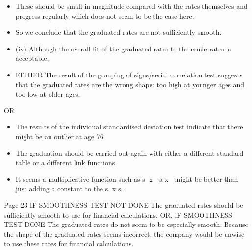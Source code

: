 \documentclass[a4paper,12pt]{article}
\begin{document}
\begin{itemize}
    \item These should be small in magnitude compared with the rates themselves and
progress regularly which does not seem to be the case here.
\item So we conclude that the graduated rates are not sufficiently smooth. 
\item (iv) Although the overall fit of the graduated rates to the crude rates is
acceptable,
\item EITHER
The result of the grouping of signs/serial correlation test suggests that the
graduated rates are the wrong shape: too high at younger ages and too low at
older ages.
\end{itemize}

OR
\begin{itemize}
\item The results of the individual standardised deviation test indicate that there might be an outlier at age 76
\item The graduation should be carried out again with either a different standard
table or a different link functions
\item It seems a multiplicative function such as s
x  ax  might be better than just
adding a constant to the s
x s.
\end{itemize}

Page 23
IF SMOOTHNESS TEST NOT DONE
The graduated rates should be sufficiently smooth to use for financial
calculations.
OR, IF SMOOTHNESS TEST DONE
The graduated rates do not seem to be especially smooth.
Because the shape of the graduated rates seems incorrect, the company
would be unwise to use these rates for financial calculations. 


\end{document}
